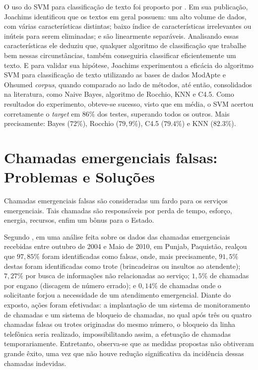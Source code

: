 O uso do SVM para classificação de texto foi proposto por \cite{joachims1998text}. Em sua publicação, Joachims identificou que os textos em geral possuem: um alto volume de dados, com várias características distintas; baixo índice de características irrelevantes ou inúteis para serem eliminadas; e são linearmente separáveis. Analisando essas características ele deduziu que, qualquer algoritmo de classificação que trabalhe bem nessas circunstâncias, também conseguiria classificar eficientemente um texto. E para validar sua hipótese, Joachims experimentou a eficácia do algoritmo SVM para classificação de texto utilizando as bases de dados ModApte e Ohsumed \textit{corpus}, quando comparado ao lado de métodos, até então, consolidados na literatura, como Naive Bayes, algoritmo de Rocchio, KNN e C4.5. Como resultados do experimento, obteve-se sucesso, visto que em média, o SVM acertou corretamente o \textit{target} em $86\%$ dos testes, superando todos os outros. Mais precisamente: Bayes ($72\%$), Rocchio ($79,9\%$), C4.5 ($79.4\%$) e KNN ($82.3\%$).

\section{Chamadas emergenciais falsas: Problemas e Soluções}
Chamadas emergenciais falsas são consideradas um fardo para os serviços emergenciais. Tais chamadas são responsáveis por perda de tempo, esforço, energia, recursos, enfim um bônus para o Estado.

Segundo \cite{waseem2010prank}, em uma análise feita sobre os dados das chamadas emergenciais recebidas entre outubro de 2004 e Maio de 2010, em Punjab, Paquistão, realçou que $97,85\%$ foram identificadas como falsas, onde, mais precisamente, $91,5\%$ destas foram identificadas como trote (brincadeiras ou insultos ao atendente); $7,27\%$ por busca de informações não relacionadas ao serviço; $1,5\%$ de chamadas por engano (discagem de número errado); e $0,14\%$ de chamadas onde o solicitante forjou a necessidade de um atendimento emergencial. 
Diante do exposto, ações foram efetivadas: a implantação de um sistema de monitoramento de chamadas e um sistema de bloqueio de chamadas, no qual após três ou quatro chamadas falsas ou trotes originadas do mesmo número, o bloqueio da linha telefônica seria realizado, impossibilitando assim, a efetuação de chamadas temporariamente.
Entretanto, observa-se que as medidas propostas não obtiveram grande êxito, uma vez que não houve redução significativa da incidência dessas chamadas indevidas.

